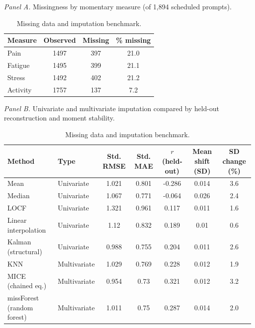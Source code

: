 \begin{table}[H]
\raggedright
\caption{Missing data and imputation benchmark.}
\label{tab:sup-imputation}
\footnotesize
\begingroup
\setlength{\tabcolsep}{4pt}
\renewcommand{\arraystretch}{1.08}
\noindent\textit{Panel A.} Missingness by momentary measure (of 1,894 scheduled prompts).\par\vspace{2pt}
\begin{tabular*}{\textwidth}{@{\extracolsep{\fill}}lccc@{}}
\toprule
Measure & Observed & Missing & \% missing \\
\midrule
Pain & 1497 & 397 & 21.0 \\
Fatigue & 1495 & 399 & 21.1 \\
Stress & 1492 & 402 & 21.2 \\
Activity & 1757 & 137 & 7.2 \\
\bottomrule
\end{tabular*}
\par\vspace{6pt}\noindent\textit{Panel B.} Univariate and multivariate imputation compared by held-out reconstruction and moment stability.\par\vspace{2pt}
\begin{tabular*}{\textwidth}{@{\extracolsep{\fill}}llccccc@{}}
\toprule
Method & Type & Std. RMSE & Std. MAE & $r$ (held-out) & Mean shift (SD) & SD change (\%) \\
\midrule
Mean & Univariate & 1.021 & 0.801 & -0.286 & 0.014 & 3.6 \\
Median & Univariate & 1.067 & 0.771 & -0.064 & 0.026 & 2.4 \\
LOCF & Univariate & 1.321 & 0.961 & 0.117 & 0.011 & 1.6 \\
Linear interpolation & Univariate & 1.12 & 0.832 & 0.189 & 0.01 & 0.6 \\
Kalman (structural) & Univariate & 0.988 & 0.755 & 0.204 & 0.011 & 2.6 \\
KNN & Multivariate & 1.029 & 0.769 & 0.228 & 0.012 & 1.9 \\
MICE (chained eq.) & Multivariate & 0.954 & 0.73 & 0.321 & 0.012 & 3.2 \\
missForest (random forest) & Multivariate & 1.011 & 0.75 & 0.287 & 0.014 & 2.0 \\
\bottomrule
\end{tabular*}

\end{table}
